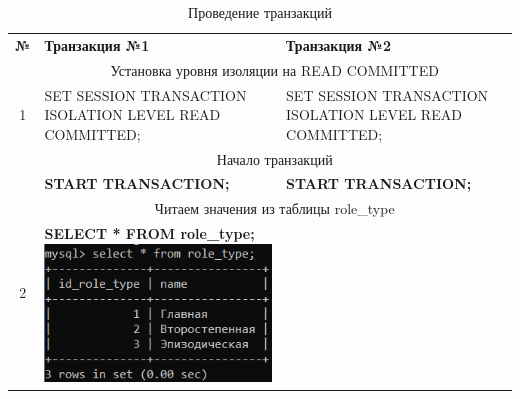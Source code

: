 \documentclass[11pt,a4paper,final]{article} %
\begin{document}
\begin{table}[H]
	\caption{Проведение транзакций}
	\label{tab:tb2}
	
	\begin{tabularx}{\textwidth}{|c|X|X|}
		\cline{1-3}
		\textbf{№} & \textbf{Транзакция №1} & \textbf{Транзакция №2} \\
		\cline{1-3}
		
		\multirow{3}{*}{1} & \multicolumn{2}{c|}{Установка уровня изоляции на READ COMMITTED}\\
		\cline{2-3}
		& 
		\vspace{-6pt}
		\hspace{-5pt}
		{\parbox{0.85\linewidth}{SET SESSION TRANSACTION ISOLATION LEVEL READ COMMITTED;}}
		& 
		\vspace{-6pt}
		\hspace{-5pt}
		{\parbox{0.85\linewidth}{SET SESSION TRANSACTION ISOLATION LEVEL READ COMMITTED;}}
		\\
		\cline{1-3}
		
		
		
		
		\multirow{3}{*}{1} & \multicolumn{2}{c|}{Начало транзакций}\\
		\cline{2-3}
		& 
		\vspace{-6pt}
		\hspace{-5pt}
		\textbf{START TRANSACTION;}
		& 
		\vspace{-6pt}
		\hspace{-5pt}
		\textbf{START TRANSACTION;}
		\\
		\cline{1-3}
		
		\multirow{3}{*}{2} & \multicolumn{2}{c|}{Читаем значения из таблицы role\_type}\\
		\cline{2-3}
		& 
		\vspace{-6pt}
		\hspace{-8.5pt}
		\textbf{SELECT * FROM role\_type;}
		\includegraphics[width=1\linewidth]{pic23.png}
		& 
		\vspace{-6pt}
		\hspace{-8.5pt}
		\\
		\cline{1-3}
		
		
	\end{tabularx}
\end{table}		
\end{document}
